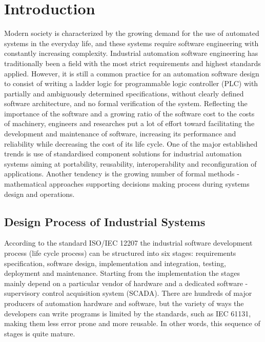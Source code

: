 
\chapter*{Introduction}



Modern society is characterized by the growing demand for the use of automated
systems in the everyday life, and these systems require software engineering
with constantly increasing complexity. Industrial automation software
engineering has traditionally been a field with the most strict requirements
and highest standards applied. However, it is still a common practice for an
automation software design to consist of writing a ladder logic for programmable
logic controller (PLC) with partially and ambiguously determined specifications,
without clearly defined software architecture, and no formal verification of the
system.
Reflecting the importance of the software and a growing ratio of the software
cost to the costs of machinery, engineers and researches put a lot of effort
toward facilitating the development and maintenance of software, increasing its
performance and reliability while decreasing the cost of its life cycle. One of
the major established trends is use of standardised component solutions for
industrial automation systems aiming at portability, reusability,
interoperability and reconfiguration of applications. Another tendency is
the growing number of formal methods - mathematical approaches supporting
decisions making process during systems design and operations.

\section*{Design Process of Industrial Systems}

According to the standard ISO/IEC 12207 \cite{_iso/iec_12207_2008} the
industrial software development process (life cycle process) can be structured
into six stages: requirements specification, software design, implementation and
integration, testing, deployment and maintenance. Starting from the
implementation the stages mainly depend on a particular vendor of hardware
and a dedicated software - supervisory control acquisition system (SCADA).
There are hundreds of major producers of automation hardware and software, but
the variety of ways the developers can write programs is limited by the standards,
such as {IEC 61131}, making them less error prone and more reusable. In other
words, this sequence of stages is quite mature. 

